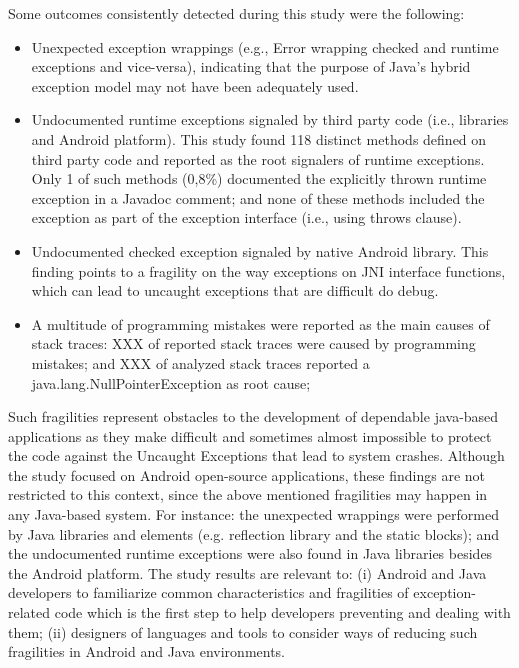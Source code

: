 \documentclass[conference]{IEEEtran}
\begin{document}

Some outcomes consistently detected during this study were the following:

\begin{itemize}


   \item  Unexpected exception wrappings (e.g., Error wrapping checked and runtime
    exceptions and vice-versa), indicating that the purpose of Java's hybrid exception model may not have been adequately used.

   \item Undocumented runtime exceptions signaled by third party  code (i.e., libraries and Android platform). 
This study found 118 distinct methods defined on third party code and  reported as the root signalers of 
runtime exceptions. Only 1 of such methods (0,8\%) documented the explicitly thrown runtime exception 
in a Javadoc comment; and none of these methods included the exception as part of the exception 
interface (i.e., using throws clause).

   \item Undocumented checked exception signaled by native Android library. This finding points to a fragility 
on the way exceptions on JNI interface functions, which can lead to uncaught exceptions that are difficult do 
debug.  

  \item  A multitude of programming mistakes were reported as the main causes of stack traces:
 XXX  of reported stack traces were caused by programming mistakes; and XXX of analyzed stack
 traces reported a java.lang.NullPointerException as root cause;

\end{itemize}

Such fragilities represent obstacles to the development of dependable java-based applications as they make difficult and 
sometimes almost impossible to protect the code against the Uncaught Exceptions that lead to system crashes.
Although the study focused on Android open-source applications, these findings are not restricted to this context, since 
the above mentioned fragilities may happen in any Java-based system. 
For instance: the unexpected wrappings were performed by Java libraries and elements (e.g. reflection library and 
the static blocks); and the undocumented runtime exceptions were also found in Java libraries besides the Android platform.
The study results are relevant to: (i) Android and Java developers to familiarize common characteristics and fragilities of exception-related code 
which is the first step to help developers preventing and dealing with them; (ii) designers of languages and tools to consider ways of reducing 
such fragilities in Android and Java environments.
\end{document}

